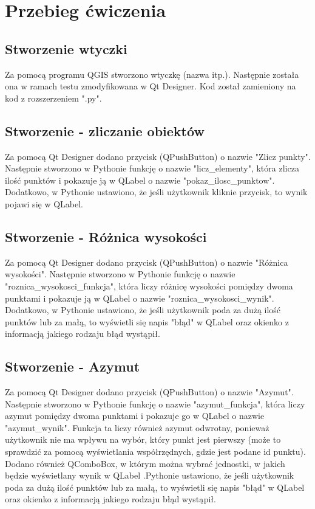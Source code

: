 \section{Przebieg ćwiczenia}

\subsection{Stworzenie wtyczki}
Za pomocą programu QGIS stworzono wtyczkę (nazwa itp.). Następnie została ona w ramach testu zmodyfikowana w Qt Designer. Kod został
zamieniony na kod z rozszerzeniem ".py".

\subsection{Stworzenie - zliczanie obiektów}
Za pomocą Qt Designer dodano przycisk (QPushButton) o nazwie "Zlicz punkty". Następnie stworzono w Pythonie funkcję o nazwie "licz\_elementy", która zlicza ilość punktów i pokazuje ją w QLabel o nazwie "pokaz\_ilosc\_punktow". Dodatkowo, w Pythonie ustawiono, że jeśli użytkownik kliknie przycisk, to wynik pojawi się w QLabel.

\subsection{Stworzenie - Różnica wysokości}
Za pomocą Qt Designer dodano przycisk (QPushButton) o nazwie "Różnica wysokości". Następnie stworzono w Pythonie funkcję o nazwie "roznica\_wysokosci\_funkcja", która liczy różnicę wysokości pomiędzy dwoma punktami i pokazuje ją w QLabel o nazwie "roznica\_wysokosci\_wynik". Dodatkowo, w Pythonie ustawiono, że jeśli użytkownik poda za dużą ilość punktów lub za małą, to wyświetli się napis "błąd" w QLabel oraz okienko z informacją jakiego rodzaju błąd wystąpił.

\subsection{Stworzenie - Azymut}
Za pomocą Qt Designer dodano przycisk (QPushButton) o nazwie "Azymut". Następnie stworzono w Pythonie funkcję o nazwie "azymut\_funkcja", która liczy azymut pomiędzy dwoma punktami i pokazuje go w QLabel o nazwie "azymut\_wynik". Funkcja ta liczy również azymut odwrotny, ponieważ użytkownik nie ma wpływu na wybór, który punkt jest pierwszy (może to sprawdzić za pomocą wyświetlania współrzędnych, gdzie jest podane id punktu). Dodano również QComboBox, w którym można wybrać jednostki, w jakich będzie wyświetlany wynik w QLabel .Pythonie ustawiono, że jeśli użytkownik poda za dużą ilość punktów lub za małą, to wyświetli się napis "błąd" w QLabel oraz okienko z informacją jakiego rodzaju błąd wystąpił.

